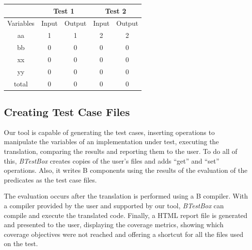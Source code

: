 \documentclass[runningheads]{llncs}
\begin{document}
\begin{center}
\begin{tabular}{c|c|c|c|c|}
\cline{2-5}
                                & \multicolumn{2}{c|}{Test 1} & \multicolumn{2}{c|}{Test 2} \\ \hline
\multicolumn{1}{|c|}{Variables} & Input        & Output       & Input        & Output       \\ \hline
\multicolumn{1}{|c|}{aa}        & 1            & 1            & 2            & 2            \\ \hline
\multicolumn{1}{|c|}{bb}        & 0            & 0            & 0            & 0            \\ \hline
\multicolumn{1}{|c|}{xx}        & 0            & 0            & 0            & 0            \\ \hline
\multicolumn{1}{|c|}{yy}        & 0            & 0            & 0            & 0            \\ \hline
\multicolumn{1}{|c|}{total}     & 0            & 0            & 0            & 0            \\ \hline
\end{tabular}
\end{center}

\subsection{Creating Test Case Files}

Our tool is capable of generating the test cases, inserting operations to manipulate the variables of an implementation under test, executing the translation, comparing the results and reporting them to the user. To do all of this, \textit{BTestBox} creates copies of the user's files and adds ``get'' and ``set'' operations. Also, it writes B components using the results of the evaluation of the predicates as the test case files.

The evaluation occurs after the translation is performed using a B compiler. With a compiler provided by the user and supported by our tool, \textit{BTestBox} can compile and execute the translated code. Finally, a HTML report file is generated and presented to the user, displaying the coverage metrics, showing which coverage objectives were not reached and offering a shortcut for all the files used on the test.
\end{document}
